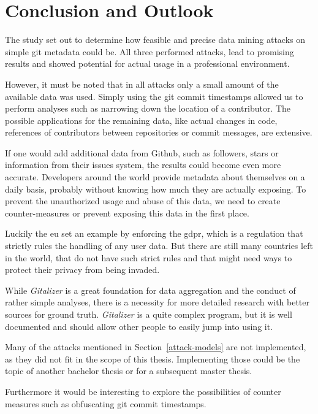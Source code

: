 \chapter{Conclusion and Outlook}

The study set out to determine how feasible and precise data mining attacks on simple git metadata could be.
All three performed attacks, lead to promising results and showed potential for actual usage in a professional environment.

However, it must be noted that in all attacks only a small amount of the available data was used.
Simply using the git commit timestamps allowed us to perform analyses such as narrowing down the location of a contributor.
The possible applications for the remaining data, like actual changes in code, references of contributors between repositories or commit messages, are extensive.

If one would add additional data from Github, such as followers, stars or information from their issues system, the results could become even more accurate.
Developers around the world provide metadata about themselves on a daily basis, probably without knowing how much they are actually exposing.
To prevent the unauthorized usage and abuse of this data, we need to create counter-measures or prevent exposing this data in the first place.

Luckily the \ac{eu} set an example by enforcing the \ac{gdpr}, which is a regulation that strictly rules the handling of any user data.
But there are still many countries left in the world, that do not have such strict rules and that might need ways to protect their privacy from being invaded.

While \emph{Gitalizer} is a great foundation for data aggregation and the conduct of rather simple analyses, there is a necessity for more detailed research with better sources for ground truth.
\emph{Gitalizer} is a quite complex program, but it is well documented and should allow other people to easily jump into using it.

Many of the attacks mentioned in Section~\ref{attack-models} are not implemented, as they did not fit in the scope of this thesis.
Implementing those could be the topic of another bachelor thesis or for a subsequent master thesis.

Furthermore it would be interesting to explore the possibilities of counter measures such as obfuscating git commit timestamps.
